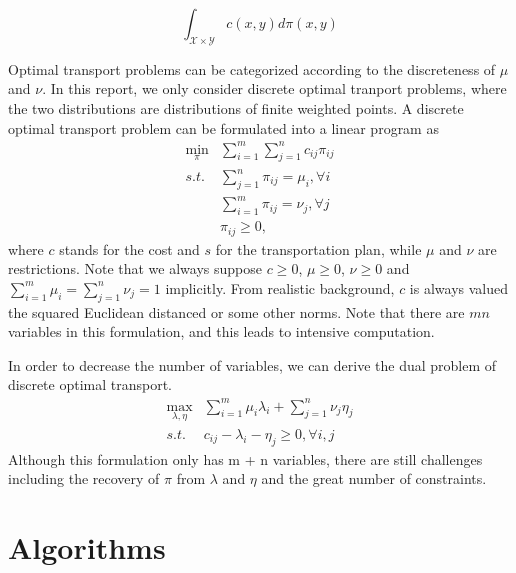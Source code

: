 \documentclass{article}
\begin{document}
\begin{equation}
\int_{ \mathcal{X} \times \mathcal{Y} } c ( x, y)  d \pi ( x, y ) 
\label{def}
\end{equation}

Optimal transport problems can be categorized according to the discreteness of $\mu$ and $\nu$. In this report, we only consider discrete optimal tranport problems, where the two distributions are distributions of finite weighted points.
A discrete optimal transport problem can be formulated into a linear program as
\begin{equation} \label{Eq:StdLP}
\begin{aligned}
\min_{\pi} & \sum_{i=1}^{m}\sum_{j=1}^{n} c_{ i j } \pi_{ i j }\\
s.t. & \sum_{j=1}^{n}\pi_{ i j } = \mu_i, \forall i\\
& \sum_{i=1}^{m}\pi_{ i j } = \nu_j, \forall j \\
& \pi_{ij} \geq 0,
\end{aligned}
\end{equation}
where $c$ stands for the cost and $s$ for the transportation plan, while $\mu$ and $\nu$ are restrictions. Note that we always suppose $ c \geq 0 $, $ \mu \geq 0 $, $ \nu \geq 0 $ and $ \sum_{i=1}^{m}{\mu_i} = \sum_{j=1}^{n}{\nu_j} = 1 $ implicitly. From realistic background, $c$ is always valued the squared Euclidean distanced or some other norms. Note that there are $ m n $ variables in this formulation, and this leads to intensive computation.

In order to decrease the number of variables, we can derive the dual problem of discrete optimal transport.
\begin{equation} \label{Eq:StdLP_dual}
  \begin{aligned}
  \max_{\lambda,\eta} & \sum_{i=1}^{m}\mu_{i}\lambda_{i}+\sum_{j=1}^{n}\nu_{j}\eta_{j}\\
  s.t. & c_{i j}-\lambda_{i}-\eta_{j}\geq0, \forall i, j
  \end{aligned}
\end{equation}
Although this formulation only has m + n variables, there are still challenges including the recovery of $\pi$ from $\lambda$ and $\eta$ and the great number of constraints.
\section{Algorithms}
\end{document}

